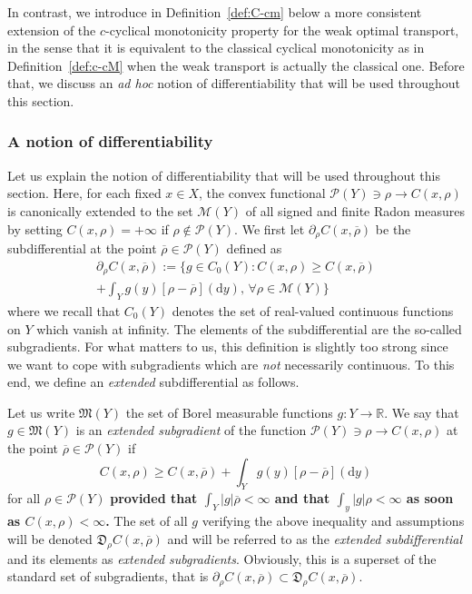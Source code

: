 \documentclass[leqno, 11pt, a4paper]{amsart}
\theoremstyle{definition}
\newcommand{\R}{\mathbb{R}}
\newcommand{\cP}{\mathcal{P}}
\newcommand{\cM}{\mathcal{M}}
\newcommand{\dd}{\mathrm{d}}
\begin{document}
In contrast, we introduce in Definition~\ref{def:C-cm} below a more consistent extension of the $c$-cyclical monotonicity property for the weak optimal transport, in the sense that it is equivalent to the classical cyclical monotonicity as in Definition~\ref{def:c-cM} when the weak transport is actually the classical one. Before that, we discuss an \textit{ad hoc} notion of differentiability that will be used throughout this section.
\subsubsection{A notion of differentiability}\label{sec:diff}
Let us explain the notion of differentiability that will be used throughout this section. Here, for each fixed $x \in X$, the convex functional $\cP(Y) \ni \rho \to C(x, \rho)$ is canonically extended to the set $\cM(Y)$ of all signed and finite Radon measures by setting $C(x, \rho) = +\infty$ if $\rho \notin \cP(Y)$. We first let $\partial_\rho C(x, \overline{\rho})$ be the subdifferential at the point $\overline{\rho} \in \cP(Y)$ defined as
\begin{multline}\label{eq:subdiff-cont}
    \partial_\rho C(x, \overline{\rho}) := \Bigg\{ g \in C_0(Y) : C(x, \rho) \geq C(x, \overline{\rho}) \\+ \int_{Y} g(y)  [\rho - \overline{\rho}](\dd y), \, \forall \rho \in \cM(Y)\Bigg\}
\end{multline}
where we recall that $C_0(Y)$ denotes the set of real-valued continuous functions on $Y$ which vanish at infinity. The elements of the subdifferential are the so-called subgradients. For what matters to us, this definition is slightly too strong since we want to cope with subgradients which are \textit{not} necessarily continuous. To this end, we define an \textit{extended} subdifferential as follows. 

Let us write $\mathfrak{M}(Y)$ the set of Borel measurable functions $g : Y \to \R$. We say that $g \in \mathfrak{M}(Y)$ is an \textit{extended subgradient} of the function $\cP(Y) \ni \rho \to C(x, \rho)$ at the point $\overline{\rho} \in \cP(Y)$ if 
$$
C(x, \rho) \geq C(x, \overline{\rho}) + \int_{Y} g(y)[\rho - \overline{\rho}](\dd y)
$$
for all $\rho \in \cP(Y)$ \textbf{provided that $\int_Y |g| \overline{\rho} < \infty$ and that $\int_y |g| \rho < \infty$ as soon as $C(x, \rho) < \infty$.} The set of all $g$ verifying the above inequality and assumptions will be denoted $\mathfrak{D}_\rho C(x, \overline{\rho})$ and will be referred to as the \textit{extended subdifferential} and its elements as \textit{extended subgradients}. Obviously, this is a superset of the standard set of subgradients, that is $\partial_\rho C(x, \overline{\rho}) \subset \mathfrak{D}_\rho C(x, \overline{\rho})$. 
\end{document}
